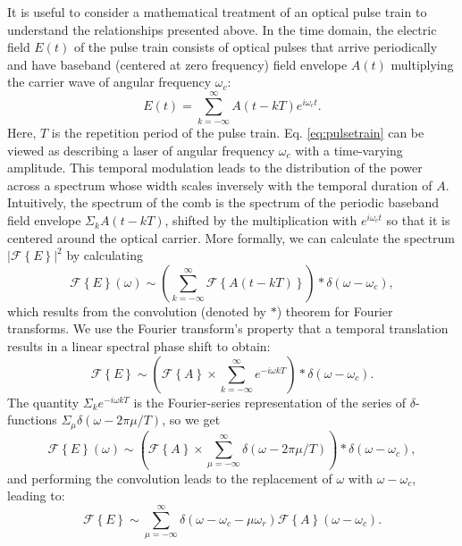 It is useful to consider a mathematical treatment of an optical pulse train to understand the relationships presented above. In the time domain, the electric field $E(t)$ of the pulse train consists of optical pulses that arrive periodically and have baseband (centered at zero frequency) field envelope $A(t)$ multiplying the carrier wave of angular frequency $\omega_c$:
\begin{equation}
E(t)=\sum_{k=-\infty}^{\infty} A(t-kT)e^{i\omega_c t}. \label{eq:pulsetrain}
\end{equation}
Here, $T$ is the repetition period of the pulse train. Eq. \ref{eq:pulsetrain} can be viewed as describing a laser of angular frequency $\omega_c$ with a time-varying amplitude. This temporal modulation leads to the distribution of the power across a spectrum whose width scales inversely with the temporal duration of $A$. Intuitively, the spectrum of the comb is the spectrum of the periodic baseband field envelope $\Sigma_k A(t-kT)$, shifted by the multiplication with $e^{i\omega_c t}$ so that it is centered around the optical carrier. More formally, we can calculate the spectrum $|\mathcal{F}\left\{E\right\}|^2$ by calculating
\begin{equation}
\mathcal{F}\left\{E\right\}(\omega)\sim\left(\sum_{k=-\infty}^{\infty}\mathcal{F}\left\{A(t-kT)\right\}\right)*\delta(\omega-\omega_c),
\end{equation}
which results from the convolution (denoted by $*$) theorem for Fourier transforms. We use the Fourier transform's property that a temporal translation results in a linear spectral phase shift to obtain:
\begin{equation}
\mathcal{F}\left\{E\right\}\sim\left(\mathcal{F}\left\{A\right\}\times\sum_{k=-\infty}^{\infty}e^{-i\omega kT}\right)*\delta(\omega-\omega_c).
\end{equation}
The quantity $\Sigma_ke^{-i\omega kT}$ is the Fourier-series representation of the series of $\delta$-functions \mbox{$\Sigma_\mu\delta(\omega-2\pi\mu/T)$}, so we get
\begin{equation}
\mathcal{F}\left\{E\right\}(\omega)\sim\left(\mathcal{F}\left\{A\right\}\times\sum_{\mu=-\infty}^{\infty}\delta\left(\omega-2\pi \mu/T\right)\right)*\delta(\omega-\omega_c),
\end{equation}
and performing the convolution leads to the replacement of $\omega$ with $\omega-\omega_c$, leading to:
\begin{equation}
\mathcal{F}\left\{E\right\}\sim\sum_{\mu=-\infty}^{\infty}\delta\left(\omega-\omega_c-\mu\omega_r\right)\mathcal{F}\left\{A\right\}(\omega-\omega_c). \label{eq:combspectrum}
\end{equation}
